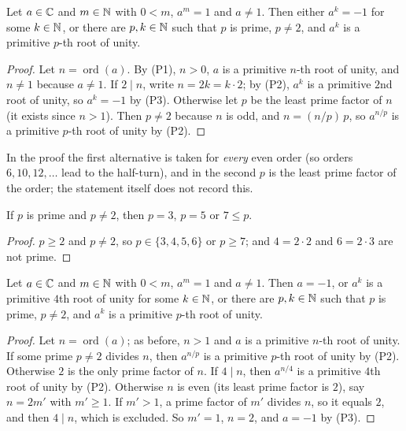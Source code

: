 \begin{lemma}\label{sr:lem:root-cases}
Let $a\in\mathbb C$ and $m\in\mathbb N$ with $0<m$, $a^m=1$ and $a\ne1$. Then either $a^k=-1$ for some $k\in\mathbb N$, or there are
$p,k\in\mathbb N$ such that $p$ is prime, $p\ne2$, and $a^k$ is a primitive $p$-th root of unity.
\end{lemma}

\begin{proof}
Let $n=\operatorname{ord}(a)$. By (P1), $n>0$, $a$ is a primitive $n$-th root of unity, and $n\ne1$ because $a\ne1$.
If $2\mid n$, write $n=2k=k\cdot2$; by (P2), $a^k$ is a primitive $2$nd root of unity, so $a^k=-1$ by (P3). Otherwise
let $p$ be the least prime factor of $n$ (it exists since $n>1$). Then $p\ne2$ because $n$ is odd, and $n=(n/p)\,p$, so
$a^{n/p}$ is a primitive $p$-th root of unity by (P2).
\end{proof}

In the proof the first alternative is taken for \emph{every} even order (so orders $6,10,12,\dots$ lead to the
half-turn), and in the second $p$ is the least prime factor of the order; the statement itself does not record this.

\begin{lemma}\label{sr:lem:prime-cases}
If $p$ is prime and $p\ne2$, then $p=3$, $p=5$ or $7\le p$.
\end{lemma}

\begin{proof}
$p\ge2$ and $p\ne2$, so $p\in\{3,4,5,6\}$ or $p\ge7$; and $4=2\cdot2$ and $6=2\cdot3$ are not prime.
\end{proof}

\begin{lemma}\label{sr:lem:root-cases2}
Let $a\in\mathbb C$ and $m\in\mathbb N$ with $0<m$, $a^m=1$ and $a\ne1$. Then $a=-1$, or $a^k$ is a primitive $4$th root of unity for
some $k\in\mathbb N$, or there are $p,k\in\mathbb N$ such that $p$ is prime, $p\ne2$, and $a^k$ is a primitive $p$-th root of unity.
\end{lemma}

\begin{proof}
Let $n=\operatorname{ord}(a)$; as before, $n>1$ and $a$ is a primitive $n$-th root of unity. If some prime $p\ne2$
divides $n$, then $a^{n/p}$ is a primitive $p$-th root of unity by (P2). Otherwise $2$ is the only prime factor of $n$.
If $4\mid n$, then $a^{n/4}$ is a primitive $4$th root of unity by (P2). Otherwise $n$ is even (its least prime factor
is $2$), say $n=2m'$ with $m'\ge1$. If $m'>1$, a prime factor of $m'$ divides $n$, so it equals $2$, and then $4\mid
n$, which is excluded. So $m'=1$, $n=2$, and $a=-1$ by (P3).
\end{proof}

